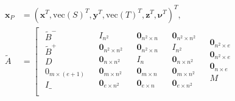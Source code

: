 \begin{equation}
    \label{tab:equ-3-49}
    \begin{aligned}
        \mathbf{x}_P&=\left( \mathbf{x}^T,\mathrm{vec}\left( S \right) ^T,\mathbf{y}^T,\mathrm{vec}\left( T \right) ^T,\mathbf{z}^T,\mathbf{\nu }^T \right) ^T,\\
        \tilde{A}&=\left[ \begin{matrix}
        \begin{array}{l}
        \tilde{B}^-\\
        \tilde{B}^+\\
        D\\
        0_{m\times \left( e+1 \right)}\\
        I\_\\
    \end{array}&		\begin{array}{c}
        I_{n^2}\\
        \mathbf{0}_{n^2\times n^2}\\
        \mathbf{0}_{n\times n^2}\\
        \mathbf{0}_{m\times n^2}\\
        \mathbf{0}_{e\times n^2}\\
    \end{array}&		\begin{array}{c}
        \mathbf{0}_{n^2\times n}\\
        \mathbf{0}_{n^2\times n}\\
        I_n\\
        \mathbf{0}_{m\times n}\\
        \mathbf{0}_{e\times n}\\
    \end{array}&		\begin{array}{c}
        \mathbf{0}_{n^2\times n^2}\\
        I_{n^2}\\
        \mathbf{0}_{n\times n^2}\\
        \mathbf{0}_{m\times n^2}\\
        \mathbf{0}_{e\times n^2}\\
    \end{array}&		\begin{array}{c}
        \mathbf{0}_{n^2\times e}\\
        \mathbf{0}_{n^2\times e}\\
        \mathbf{0}_{n\times e}\\
        M\\

\end{array}
\end{matrix}
\end{aligned}
\end{equation}

